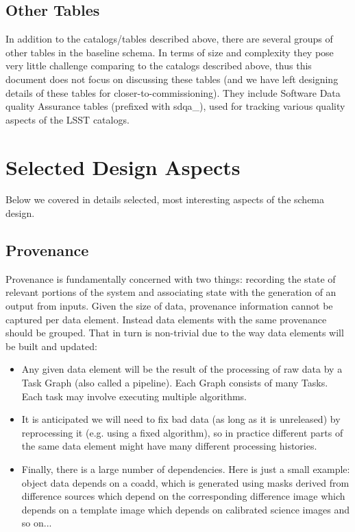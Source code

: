 \documentclass[DM,toc]{lsstdoc}
\begin{document}
\subsection{Other Tables}

In addition to the catalogs/tables described above, there are several groups of other tables in the baseline schema. In terms of size and complexity they pose very little challenge comparing to the catalogs described above, thus this document does not focus on discussing these tables (and we have left designing details of these tables for closer-to-commissioning). They include Software Data quality Assurance tables (prefixed with sdqa\_), used for tracking various quality aspects of the LSST catalogs.

\section{Selected Design Aspects}

Below we covered in details selected, most interesting aspects of the schema design.

\subsection{Provenance}

Provenance is fundamentally concerned with two things: recording the state of relevant portions of the system and associating state with the generation of an output from inputs. Given the size of data, provenance information cannot be captured per data element. Instead data elements with the same provenance should be grouped. That in turn is non-trivial due to the way data elements will be built and updated:

\begin{itemize}
  \item Any given data element will be the result of the processing of raw data by a Task Graph (also called a pipeline). Each Graph consists of many Tasks. Each task may involve executing multiple algorithms.
  \item It is anticipated we will need to fix bad data (as long as it is unreleased) by reprocessing it (e.g. using a fixed algorithm), so in practice different parts of the same data element might have many different processing histories.
  \item Finally, there is a large number of dependencies. Here is just a small example: object data depends on a coadd, which is generated using masks derived from difference sources which depend on the corresponding difference image which depends on a template image which depends on calibrated science images and so on...
\end{itemize}
\end{document}
